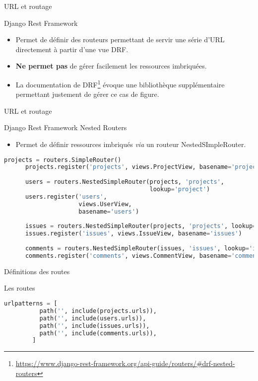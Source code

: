 \begin{frame}{URL et routage}
  \begin{block}{Django Rest Framework}
    \begin{itemize}
    \item Permet de définir des routeurs permettant de servir une
      série d'URL directement à partir d'une vue DRF.
    \item \textbf{Ne permet pas} de gérer facilement les ressources imbriquées.
    \item La documentation de
      DRF\footnote{\url{https://www.django-rest-framework.org/api-guide/routers/\#drf-nested-routers}}
      évoque une bibliothèque supplémentaire permettant justement de
      gérer ce cas de figure.
    \end{itemize}
  \end{block}
\end{frame}

\begin{frame}[fragile]{URL et routage}
  \begin{block}{Django Rest Framework Nested Routers}
    \begin{itemize}
    \item Permet de définir ressources imbriqués \textit{via} un
      routeur \textsf{NestedSImpleRouter}.
    \end{itemize}
  \end{block}

  \begin{center}
    \tiny
    \begin{lstlisting}[language=python]
      projects = routers.SimpleRouter()
      projects.register('projects', views.ProjectView, basename='projects')
      
      users = routers.NestedSimpleRouter(projects, 'projects',
                                         lookup='project')
      users.register('users',
                     views.UserView,
                     basename='users')
      
      issues = routers.NestedSimpleRouter(projects, 'projects', lookup='project')
      issues.register('issues', views.IssueView, basename='issues')
      
      comments = routers.NestedSimpleRouter(issues, 'issues', lookup='issue')
      comments.register('comments', views.CommentView, basename='comments')
    \end{lstlisting}
  \end{center}
\end{frame}

\begin{frame}[fragile]{Définitions des routes}
  \begin{block}{Les routes}
    \begin{center}
      \tiny
      \begin{lstlisting}[language=python]
        urlpatterns = [
          path('', include(projects.urls)),
          path('', include(users.urls)),
          path('', include(issues.urls)),
          path('', include(comments.urls)),
        ]
      \end{lstlisting}
    \end{center}
  \end{block}
\end{frame}

